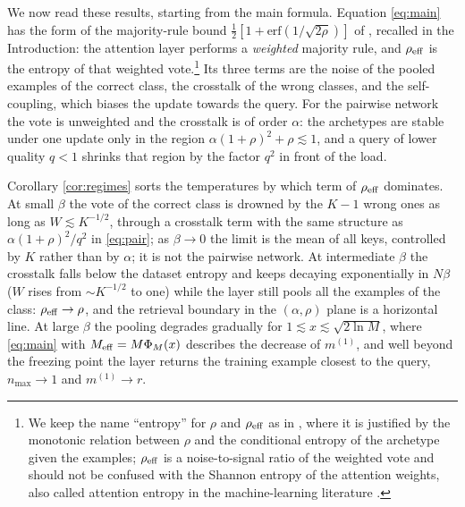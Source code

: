 \documentclass[11pt,a4paper]{article}
\newcommand{\Meff}{M_{\rm eff}}
\newcommand{\erf}{\mathrm{erf}}
\begin{document}
We now read these results, starting from the main formula. Equation \eqref{eq:main} has the form of the majority-rule bound $\frac12[1+\erf(1/\sqrt{2\rho})]$ of \cite{Alemanno2023}, recalled in the Introduction: the attention layer performs a \emph{weighted} majority rule, and $\rho_{\rm eff}$ is the entropy of that weighted vote.\footnote{We keep the name ``entropy'' for $\rho$ and $\rho_{\rm eff}$ as in \cite{Alemanno2023}, where it is justified by the monotonic relation between $\rho$ and the conditional entropy of the archetype given the examples; $\rho_{\rm eff}$ is a noise-to-signal ratio of the weighted vote and should not be confused with the Shannon entropy of the attention weights, also called attention entropy in the machine-learning literature \cite{Zhai2023}.} Its three terms are the noise of the pooled examples of the correct class, the crosstalk of the wrong classes, and the self-coupling, which biases the update towards the query. For the pairwise network the vote is unweighted and the crosstalk is of order $\alpha$: the archetypes are stable under one update only in the region $\alpha(1+\rho)^2+\rho\lesssim1$, and a query of lower quality $q<1$ shrinks that region by the factor $q^2$ in front of the load.

Corollary \ref{cor:regimes} sorts the temperatures by which term of $\rho_{\rm eff}$ dominates. At small $\beta$ the vote of the correct class is drowned by the $K-1$ wrong ones as long as $W\lesssim K^{-1/2}$, through a crosstalk term with the same structure as $\alpha(1+\rho)^2/q^2$ in \eqref{eq:pair}; as $\beta\to0$ the limit is the mean of all keys, controlled by $K$ rather than by $\alpha$; it is not the pairwise network. At intermediate $\beta$ the crosstalk falls below the dataset entropy and keeps decaying exponentially in $N\beta$ ($W$ rises from $\sim K^{-1/2}$ to one) while the layer still pools all the examples of the class: $\rho_{\rm eff}\to\rho$, and the retrieval boundary in the $(\alpha,\rho)$ plane is a horizontal line. At large $\beta$ the pooling degrades gradually for $1\lesssim x\lesssim\sqrt{2\ln M}$, where \eqref{eq:main} with $\Meff=M\Phi_M(x)$ describes the decrease of $m^{(1)}$, and well beyond the freezing point the layer returns the training example closest to the query, $n_{\max}\to1$ and $m^{(1)}\to r$.
\end{document}
